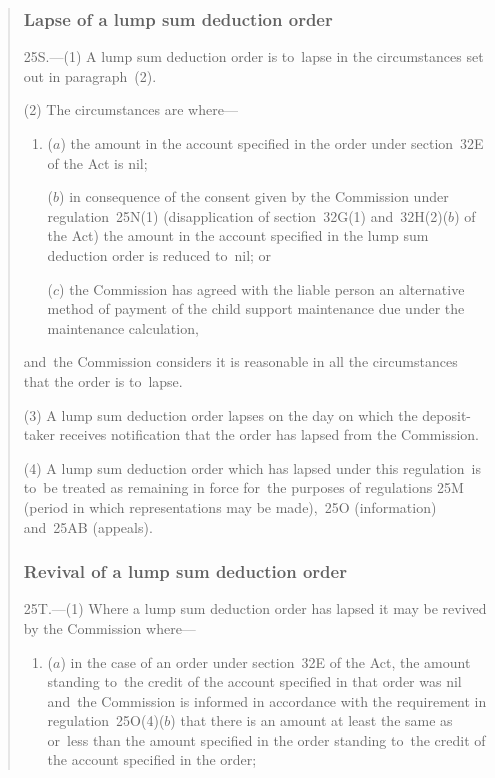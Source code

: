 \documentclass[12pt,a4paper]{article}
\begin{document}
\begin{quotation}
\subsubsection*{Lapse of a lump sum deduction order}

25S.---(1)  A lump sum deduction order is to~lapse in the circumstances set out in paragraph~(2).

(2) The circumstances are where—
\begin{enumerate}\item[]
($a$) the amount in the account specified in the order under section~32E of the Act is nil;

($b$) in consequence of the consent given by the Commission under regulation~25N(1) (disapplication of section~32G(1) and~32H(2)($b$)  of the Act) the amount in the account specified in the lump sum deduction order is reduced to~nil; or

($c$) the Commission has agreed with the liable person an alternative method of payment of the child support maintenance due under the maintenance calculation,
\end{enumerate}
and~the Commission considers it is reasonable in all the circumstances that the order is to~lapse.

(3) A lump sum deduction order lapses on the day on which the deposit-taker receives notification that the order has lapsed from the Commission.

(4) A lump sum deduction order which has lapsed under this regulation~is to~be treated as remaining in force for~the purposes of regulations 25M (period in which representations may be made),~25O (information) and~25AB (appeals).

\subsubsection*{Revival of a lump sum deduction order}

25T.---(1)  Where a lump sum deduction order has lapsed it may be revived by the Commission where—
\begin{enumerate}\item[]
($a$) in the case of an order under section~32E of the Act, the amount standing to~the credit of the account specified in that order was nil and~the Commission is informed in accordance with the requirement in regulation~25O(4)($b$)  that there is an amount at least the same as or~less than the amount specified in the order standing to~the credit of the account specified in the order;


\end{enumerate}
\end{quotation}
\end{document}

